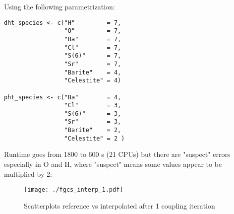 \documentclass[a4paper, 9pt]{article}
\begin{document}
Using the following parametrization:

\begin{lstlisting}
dht_species <- c("H"         = 7,
                 "O"         = 7,
                 "Ba"        = 7,
                 "Cl"        = 7,
                 "S(6)"      = 7,
                 "Sr"        = 7,
                 "Barite"    = 4,
                 "Celestite" = 4)

pht_species <- c("Ba"        = 4,
                 "Cl"        = 3,
                 "S(6)"      = 3,
                 "Sr"        = 3,
                 "Barite"    = 2,
                 "Celestite" = 2 )
\end{lstlisting}

Runtime goes from 1800 to 600 s (21 CPUs) but there are "suspect"
errors especially in O and H, where "suspect" means some values appear
to be multiplied by 2:
\begin{figure}[htbp]
  \centering
  \texttt{[image: ./fgcs\_interp\_1.pdf]}
  \caption{Scatterplots reference vs interpolated after 1 coupling
    iteration}
\end{figure}
\end{document}
